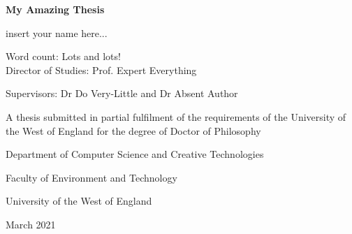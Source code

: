 \begin{titlepage}
\centering
\vspace*{1in}
\begin{Huge}\bfseries\sffamily
My Amazing Thesis\par
\end{Huge}
\vspace{0.35in}
\begin{Large}
insert your name here...\par
\end{Large}
Word count: Lots and lots!\\

\vfill
Director of Studies: Prof. Expert Everything\par
Supervisors: Dr Do Very-Little and Dr Absent Author \par
\vspace{0.3in}
A thesis submitted in partial fulfilment of the requirements of the University of the West of England for the degree of Doctor of Philosophy\par
\vspace{0.1in}
Department of Computer Science and Creative Technologies\par
Faculty of Environment and Technology\par
University of the West of England
\par
March 2021
\par
\end{titlepage}